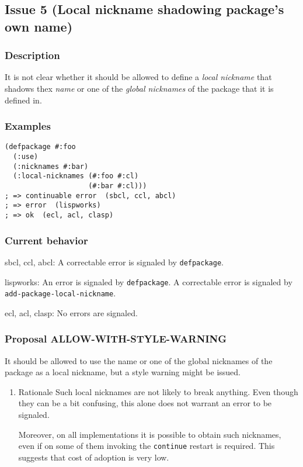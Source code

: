 \documentclass[11pt]{article}
\begin{document}
\subsection{Issue 5 (Local nickname shadowing package's own name)}
\label{sec:org5a78bde}
\subsubsection{Description}
\label{sec:org255e068}
It is not clear whether it should be allowed to define a \emph{local nickname} that
shadows thex \emph{name} or one of the \emph{global nicknames} of the package that it is
defined in.
\subsubsection{Examples}
\label{sec:org15ba800}
\begin{verbatim}
(defpackage #:foo
  (:use)
  (:nicknames #:bar)
  (:local-nicknames (#:foo #:cl)
                    (#:bar #:cl)))
; => continuable error  (sbcl, ccl, abcl)
; => error  (lispworks)
; => ok  (ecl, acl, clasp)
\end{verbatim}
\subsubsection{Current behavior}
\label{sec:orgcd1f24d}
sbcl, ccl, abcl:
  A correctable error is signaled by \texttt{defpackage}.

lispworks:
  An error is signaled by \texttt{defpackage}.
  A correctable error is signaled by \texttt{add-package-local-nickname}.

ecl, acl, clasp:
  No errors are signaled.
\subsubsection{Proposal ALLOW-WITH-STYLE-WARNING}
\label{sec:org76e4491}
It should be allowed to use the name or one of the global nicknames of the package
as a local nickname, but a style warning might be issued.
\begin{enumerate}
\item Rationale
\label{sec:orgc2dc163}
Such local nicknames are not likely to break anything. Even though they can be a
bit confusing, this alone does not warrant an error to be signaled.

Moreover, on all implementations it is possible to obtain such nicknames, even if
on some of them invoking the \texttt{continue} restart is required. This suggests that
cost of adoption is very low.
\end{enumerate}
\end{document}
